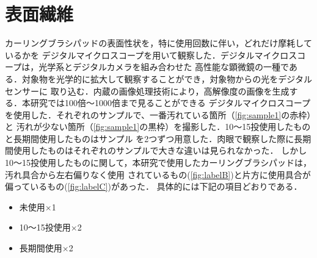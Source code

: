 \documentclass[main]{subfiles}
\begin{document}
\section{表面繊維}

カーリングブラシパッドの表面性状を，特に使用回数に伴い，どれだけ摩耗しているかを
デジタルマイクロスコープを用いて観察した．デジタルマイクロスコープは，光学系とデジタルカメラを組み合わせた
高性能な顕微鏡の一種である．対象物を光学的に拡大して観察することができ，対象物からの光をデジタルセンサーに
取り込む．内蔵の画像処理技術により，高解像度の画像を生成する．本研究では100倍～1000倍まで見ることができる
デジタルマイクロスコープを使用した．それぞれのサンプルで、一番汚れている箇所（\ref{fig:sample1}の赤枠）と
汚れが少ない箇所（\ref{fig:sample1}の黒枠）を撮影した．10～15投使用したものと長期間使用したものはサンプル
を2つずつ用意した．肉眼で観察した際に長期間使用したものはそれぞれのサンプルで大きな違いは見られなかった．
しかし10～15投使用したものに関して，本研究で使用したカーリングブラシパッドは，汚れ具合から左右偏りなく使用
されているもの(\ref{fig:labelB})と片方に使用具合が偏っているもの(\ref{fig:labelC})があった．
具体的には下記の項目どおりである．

\begin{itemize}
    \item 未使用×1
    \item 10～15投使用×2
    \item 長期間使用×2
\end{itemize}
\end{document}
